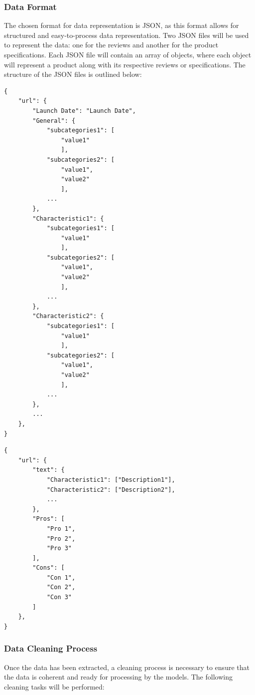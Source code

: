 \subsubsection{Data Format}
The chosen format for data representation is JSON, as this format allows for structured and easy-to-process data representation. Two JSON files will be used to represent the data: one for the reviews and another for the product specifications. Each JSON file will contain an array of objects, where each object will represent a product along with its respective reviews or specifications. The structure of the JSON files is outlined below:
\newpage
\begin{lstlisting}[style=jsonstyle, frame = single, caption=JSON Data Format Product specification, label=code:json-data-format]
{
    "url": {
        "Launch Date": "Launch Date",
        "General": {
            "subcategories1": [
                "value1"
                ],
            "subcategories2": [
                "value1",
                "value2"
                ],
            ...
        },
        "Characteristic1": {
            "subcategories1": [
                "value1"
                ],
            "subcategories2": [
                "value1",
                "value2"
                ],
            ...
        },
        "Characteristic2": {
            "subcategories1": [
                "value1"
                ],
            "subcategories2": [
                "value1",
                "value2"
                ],
            ...
        },
        ...
    },
}
\end{lstlisting}
\newpage
\begin{lstlisting}[style=jsonstyle, frame = single, caption=JSON Data Format reviews, label=code:json-data-format]
{
    "url": {
        "text": {
            "Characteristic1": ["Description1"],
            "Characteristic2": ["Description2"],
            ...
        },
        "Pros": [
            "Pro 1",
            "Pro 2",
            "Pro 3"
        ],
        "Cons": [
            "Con 1",
            "Con 2",
            "Con 3"
        ]
    },
}
\end{lstlisting}

\subsubsection{Data Cleaning Process}
Once the data has been extracted, a cleaning process is necessary to ensure that the data is coherent and ready for processing by the models. The following cleaning tasks will be performed:


